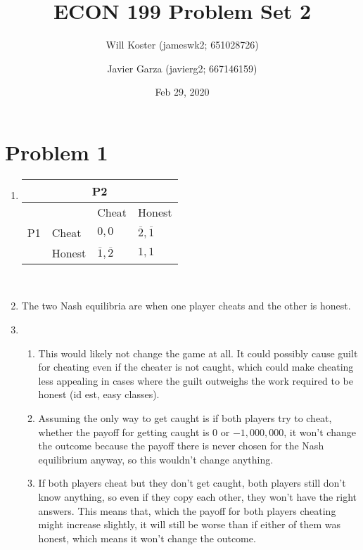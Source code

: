 \documentclass[letterpaper]{article}
\begin{document}
\title{ECON 199 Problem Set 2}
\author{Will Koster (jameswk2; 651028726) \and Javier Garza (javierg2; 667146159)}
\date{Feb 29, 2020}
\maketitle

\clearpage

\section{Problem 1}
\begin{enumerate}
    \item 
\begin{tabular}{|l|l|l|l|}
\multicolumn{4}{c}{P2}                      \\ \hline
\multirow{3}{*}{P1} &   & Cheat        & Honest        \\ \hline
                       & Cheat & $0,0$ & $\overline2, \overline1$ \\ \hline
                       & Honest & $\overline1, \overline2$ & $1,1$ \\ \hline
\end{tabular} \\
\item The two Nash equilibria are when one player cheats and the other is honest.
\item \begin{enumerate}
        \item This would likely not change the game at all. It could possibly cause guilt for cheating even if the cheater is not caught, which could make cheating less appealing in cases where the guilt outweighs the work required to be honest (id est, easy classes).
        \item Assuming the only way to get caught is if both players try to cheat, whether the payoff for getting caught is $0$ or $-1,000,000$, it won't change the outcome because the payoff there is never chosen for the Nash equilibrium anyway, so this wouldn't change anything.
        \item If both players cheat but they don't get caught, both players still don't know anything, so even if they copy each other, they won't have the right answers. This means that, which the payoff for both players cheating might increase slightly, it will still be worse than if either of them was honest, which means it won't change the outcome.
    \end{enumerate}
\end{enumerate}
\end{document}
